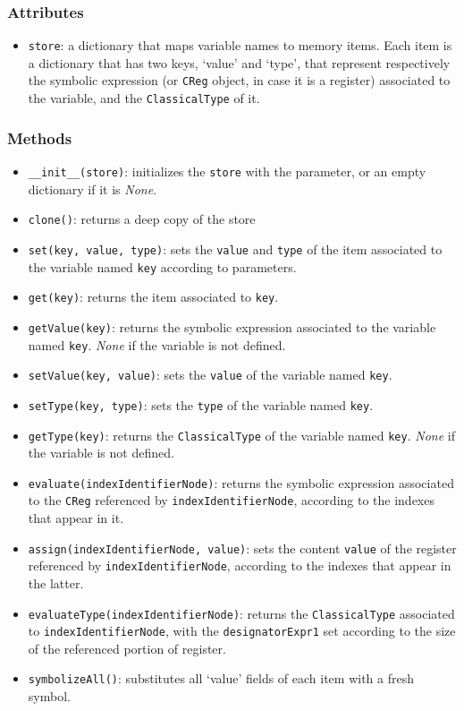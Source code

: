 \documentclass[12pt,a4paper]{report}
\theoremstyle{definition}
\theoremstyle{definition}
\theoremstyle{definition}
\begin{document}
\subsubsection{Attributes}
\begin{itemize}
    \itemsep 0em
    \item \texttt{store}: a dictionary that maps variable names to memory items. Each item is a dictionary that has two keys, `value' and `type', that represent respectively the symbolic expression (or \texttt{CReg} object, in case it is a register) associated to the variable, and the \texttt{ClassicalType} of it.
\end{itemize}
\subsubsection{Methods}
\begin{itemize}
    \itemsep 0em
    \item \texttt{\_\_init\_\_(store)}: initializes the \texttt{store} with the parameter, or an empty dictionary if it is \textit{None}.
    \item \texttt{clone()}: returns a deep copy of the store
    \item \texttt{set(key, value, type)}: sets the \texttt{value} and \texttt{type} of the item associated to the variable named \texttt{key} according to parameters.
    \item \texttt{get(key)}: returns the item associated to \texttt{key}.
    \item \texttt{getValue(key)}: returns the symbolic expression associated to the variable named \texttt{key}. \textit{None} if the variable is not defined.
    \item \texttt{setValue(key, value)}: sets the \texttt{value} of the variable named \texttt{key}.
    \item \texttt{setType(key, type)}: sets the \texttt{type} of the variable named \texttt{key}.
    \item \texttt{getType(key)}: returns the \texttt{ClassicalType} of the variable named \texttt{key}. \textit{None} if the variable is not defined.
    \item \texttt{evaluate(indexIdentifierNode)}: returns the symbolic expression associated to the \texttt{CReg} referenced by \texttt{indexIdentifierNode}, according to the indexes that appear in it.
    \item \texttt{assign(indexIdentifierNode, value)}: sets the content \texttt{value} of the register referenced by \texttt{indexIdentifierNode}, according to the indexes that appear in the latter.
    \item \texttt{evaluateType(indexIdentifierNode)}: returns the \texttt{ClassicalType} associated to \texttt{indexIdentifierNode}, with the \texttt{designatorExpr1} set according to the size of the referenced portion of register.
    \item \texttt{symbolizeAll()}: substitutes all `value' fields of each item with a fresh symbol.
\end{itemize}
\end{document}
